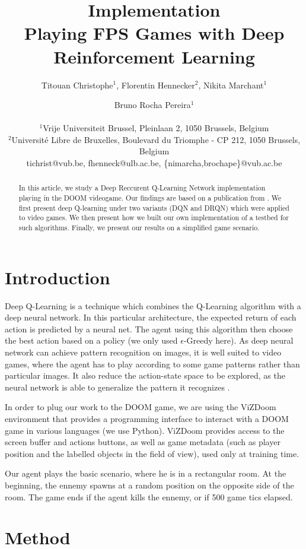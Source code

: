 \documentclass[letterpaper]{article}
\title{Implementation\\Playing FPS Games with Deep Reinforcement Learning}
\author{Titouan Christophe$^{1}$, Florentin Hennecker$^{2}$, Nikita Marchant$^{1}$ \and Bruno Rocha Pereira$^{1}$ \\
\mbox{}\\
$^1$Vrije Universiteit Brussel, Pleinlaan 2, 1050 Brussels, Belgium \\
$^2$Universit\'e Libre de Bruxelles, Boulevard du Triomphe - CP 212, 1050
Brussels, Belgium \\
tichrist@vub.be, fhenneck@ulb.ac.be, \{nimarcha,brochape\}@vub.ac.be}
\begin{document}
\maketitle

\begin{abstract}
In this article, we study a Deep Reccurent Q-Learning Network implementation
playing in the DOOM videogame. Our findings are based on a publication from
\cite{Lample2016}. We first present deep Q-learning under two variants (DQN and
DRQN) which were applied to video games. We then present how we built our own
implementation of a testbed for such algorithms. Finally, we present our results
on a simplified game scenario.
\end{abstract}

\section{Introduction}
Deep Q-Learning is a technique which combines the Q-Learning algorithm with
a deep neural network. In this particular architecture, the expected return of
each action is predicted by a neural net. The agent using this algorithm then
choose the best action based on a policy (we only used $\epsilon$-Greedy here).
As deep neural network can achieve pattern recognition on images, it is well
suited to video games, where the agent has to play according to some game
patterns rather than particular images. It also reduce the action-state space
to be explored, as the neural network is able to generalize the pattern it recognizes
.

In order to plug our work to the DOOM game, we are using the ViZDoom environment
\citep{Kempka2016} that provides a programming interface to interact with a
DOOM game in various languages (we use Python). ViZDoom provides access to the
screen buffer and actions buttons, as well as game metadata (such as player
position and the labelled objects in the field of view), used only at training time.

Our agent plays the basic scenario, where he is in a rectangular room.
At the beginning, the ennemy spawns at a random position on the opposite side of
the room. The game ends if the agent kills the ennemy, or if 500 game tics elapsed.

\section{Method}
\end{document}
